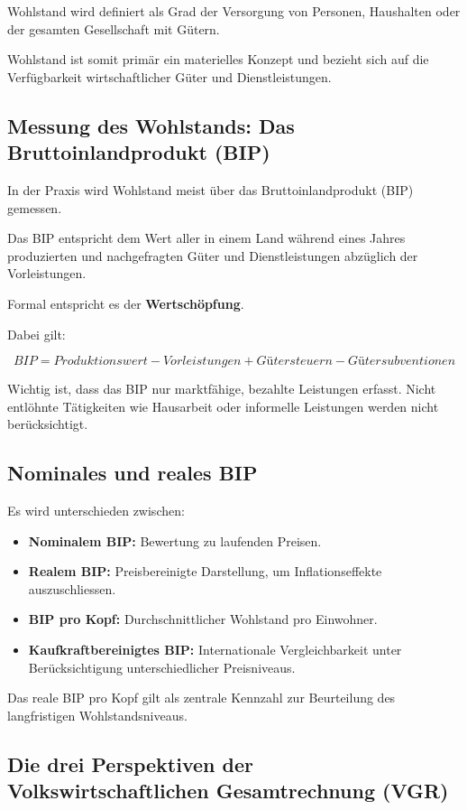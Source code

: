 Wohlstand wird definiert als Grad der Versorgung von Personen, Haushalten 
oder der gesamten Gesellschaft mit Gütern.

Wohlstand ist somit primär ein materielles Konzept und bezieht sich auf 
die Verfügbarkeit wirtschaftlicher Güter und Dienstleistungen.

\subsection{Messung des Wohlstands: Das Bruttoinlandprodukt (BIP)}

In der Praxis wird Wohlstand meist über das Bruttoinlandprodukt (BIP) gemessen.

Das BIP entspricht dem Wert aller in einem Land während eines Jahres 
produzierten und nachgefragten Güter und Dienstleistungen abzüglich 
der Vorleistungen. 

Formal entspricht es der \textbf{Wertschöpfung}.

Dabei gilt:

\[
BIP = Produktionswert - Vorleistungen + Gütersteuern - Gütersubventionen
\]

Wichtig ist, dass das BIP nur marktfähige, bezahlte Leistungen erfasst. 
Nicht entlöhnte Tätigkeiten wie Hausarbeit oder informelle Leistungen 
werden nicht berücksichtigt.

\subsection{Nominales und reales BIP}

Es wird unterschieden zwischen:

\begin{itemize}
    \item \textbf{Nominalem BIP:} Bewertung zu laufenden Preisen.
    \item \textbf{Realem BIP:} Preisbereinigte Darstellung, um Inflationseffekte 
    auszuschliessen.
    \item \textbf{BIP pro Kopf:} Durchschnittlicher Wohlstand pro Einwohner.
    \item \textbf{Kaufkraftbereinigtes BIP:} Internationale Vergleichbarkeit 
    unter Berücksichtigung unterschiedlicher Preisniveaus.
\end{itemize}

Das reale BIP pro Kopf gilt als zentrale Kennzahl zur Beurteilung 
des langfristigen Wohlstandsniveaus.

\subsection{Die drei Perspektiven der Volkswirtschaftlichen Gesamtrechnung (VGR)}

